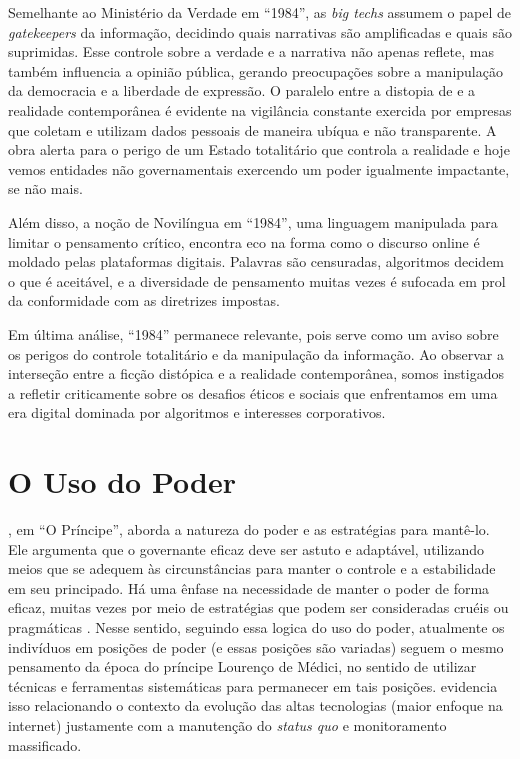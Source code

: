 \documentclass[
	12pt,
	openright,
	twoside,
	a4paper,
	english,
	french,
	spanish,
	brazil
]{abntex2}
\begin{document}
  Semelhante ao Ministério da Verdade em ``1984'', as \textit{big techs} assumem
  o papel de \textit{gatekeepers} da informação, decidindo quais narrativas são
  amplificadas e quais são suprimidas. Esse controle sobre a verdade e a
  narrativa não apenas reflete, mas também influencia a opinião pública, gerando
  preocupações sobre a manipulação da democracia e a liberdade de expressão. O
  paralelo entre a distopia de  e a realidade
  contemporânea é evidente na vigilância constante exercida por empresas que
  coletam e utilizam dados pessoais de maneira ubíqua e não transparente. A obra
  alerta para o perigo de um Estado totalitário que controla a realidade e hoje
  vemos entidades não governamentais exercendo um poder igualmente impactante,
  se não mais.

  Além disso, a noção de Novilíngua em ``1984'', uma linguagem manipulada para
  limitar o pensamento crítico, encontra eco na forma como o discurso online é
  moldado pelas plataformas digitais. Palavras são censuradas, algoritmos
  decidem o que é aceitável, e a diversidade de pensamento muitas vezes é
  sufocada em prol da conformidade com as diretrizes impostas.

  Em última análise, ``1984'' permanece relevante, pois serve como um aviso
  sobre os perigos do controle totalitário e da manipulação da informação. Ao
  observar a interseção entre a ficção distópica e a realidade contemporânea,
  somos instigados a refletir criticamente sobre os desafios éticos e sociais
  que enfrentamos em uma era digital dominada por algoritmos e interesses
  corporativos.

  \newpage

  \section{O Uso do Poder}

  , em ``O Príncipe'', aborda a natureza do
  poder e as estratégias para mantê-lo. Ele argumenta que o governante eficaz
  deve ser astuto e adaptável, utilizando meios que se adequem às circunstâncias
  para manter o controle e a estabilidade em seu principado. Há uma ênfase na
  necessidade de manter o poder de forma eficaz, muitas vezes por meio de
  estratégias que podem ser consideradas cruéis ou pragmáticas
  \cite{maquiavel-principe}. Nesse sentido, seguindo essa logica do uso do
  poder, atualmente os indivíduos em posições de poder (e essas posições são
  variadas) seguem o mesmo pensamento da época do príncipe Lourenço de Médici,
  no sentido de utilizar técnicas e ferramentas sistemáticas para permanecer em
  tais posições.  evidencia isso
  relacionando o contexto da evolução das altas tecnologias (maior enfoque na
  internet) justamente com a manutenção do \textit{status quo} e monitoramento
  massificado.
\end{document}

